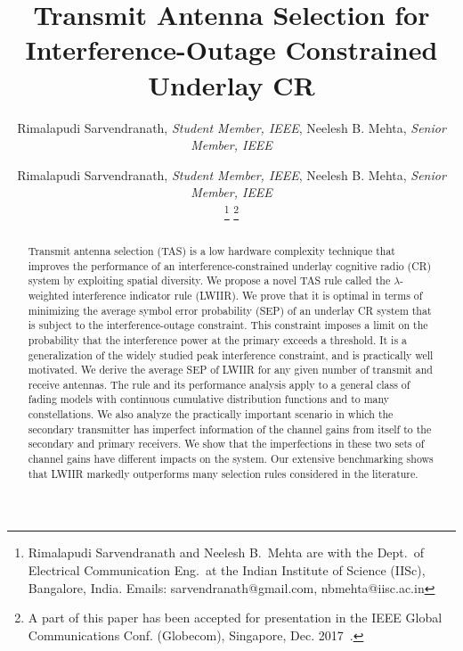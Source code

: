 \documentclass[12pt,draftcls,peerreview,onecolumn]{IEEEtran}
\begin{document}
\title{Transmit Antenna Selection for Interference-Outage Constrained Underlay CR}

\author{Rimalapudi Sarvendranath, {\it Student Member, IEEE}, Neelesh B. Mehta, {\it Senior Member, IEEE}}

\author{
	Rimalapudi Sarvendranath, {\it Student Member, IEEE}, Neelesh B. Mehta, {\it Senior Member, IEEE}
	
	\thanks{Rimalapudi Sarvendranath and Neelesh B.\ Mehta are with the
		Dept.\ of Electrical Communication Eng.\ at the Indian Institute of
		Science (IISc), Bangalore, India. Emails:
		sarvendranath@gmail.com, nbmehta@iisc.ac.in}
		\thanks{A part of this paper has been accepted for presentation in the IEEE Global
		Communications Conf. (Globecom), Singapore, Dec. 2017~\cite{sarvnedranath_2017_globecom}.}
}

\setcounter{page}{1}

\maketitle

\begin{abstract}
Transmit antenna selection (TAS) is a low hardware complexity technique that improves the performance of an interference-constrained underlay cognitive radio (CR) system by exploiting spatial diversity. We propose a novel TAS rule called the $\lambda$-weighted interference indicator rule (LWIIR). We prove that it is optimal in terms of minimizing the average symbol error probability (SEP) of an underlay CR system that is subject to the interference-outage constraint. This constraint imposes a limit on the probability that the interference power at the primary exceeds a threshold. It is a generalization of the widely studied peak interference constraint, and is practically well motivated. We derive the average SEP of LWIIR for any given number of transmit and receive antennas. The rule and its performance analysis apply to a general class of fading models with continuous cumulative distribution functions and to many constellations. We also analyze the practically important scenario in which the secondary transmitter has imperfect information of the channel gains from itself to the secondary and primary receivers. We show that the imperfections in these two sets of channel gains have different impacts on the system. Our extensive benchmarking shows that LWIIR markedly outperforms many selection rules considered in the literature.

\end{abstract}
\end{document}
